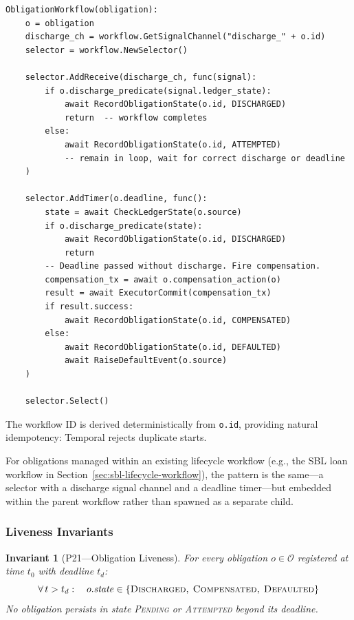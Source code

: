 \documentclass[11pt,a4paper]{article}
\newtheorem{invariant}[definition]{Invariant}
\begin{document}
\begin{lstlisting}
ObligationWorkflow(obligation):
    o = obligation
    discharge_ch = workflow.GetSignalChannel("discharge_" + o.id)
    selector = workflow.NewSelector()

    selector.AddReceive(discharge_ch, func(signal):
        if o.discharge_predicate(signal.ledger_state):
            await RecordObligationState(o.id, DISCHARGED)
            return  -- workflow completes
        else:
            await RecordObligationState(o.id, ATTEMPTED)
            -- remain in loop, wait for correct discharge or deadline
    )

    selector.AddTimer(o.deadline, func():
        state = await CheckLedgerState(o.source)
        if o.discharge_predicate(state):
            await RecordObligationState(o.id, DISCHARGED)
            return
        -- Deadline passed without discharge. Fire compensation.
        compensation_tx = await o.compensation_action(o)
        result = await ExecutorCommit(compensation_tx)
        if result.success:
            await RecordObligationState(o.id, COMPENSATED)
        else:
            await RecordObligationState(o.id, DEFAULTED)
            await RaiseDefaultEvent(o.source)
    )

    selector.Select()
\end{lstlisting}

\noindent The workflow ID is derived deterministically from \texttt{o.id}, providing natural idempotency: Temporal rejects duplicate starts.

For obligations managed within an existing lifecycle workflow (e.g., the SBL loan workflow in Section~\ref{sec:sbl-lifecycle-workflow}), the pattern is the same---a selector with a discharge signal channel and a deadline timer---but embedded within the parent workflow rather than spawned as a separate child.

\subsubsection{Liveness Invariants}
\label{sec:obligation-invariants}

\begin{invariant}[P21---Obligation Liveness]
\label{inv:obligation-liveness}
For every obligation $o \in \mathcal{O}$ registered at time $t_0$ with deadline $t_d$:
\[
\forall\, t > t_d : \quad o.\mathit{state} \in \{\textsc{Discharged},\; \textsc{Compensated},\; \textsc{Defaulted}\}
\]
No obligation persists in state \textsc{Pending} or \textsc{Attempted} beyond its deadline.
\end{invariant}
\end{document}
